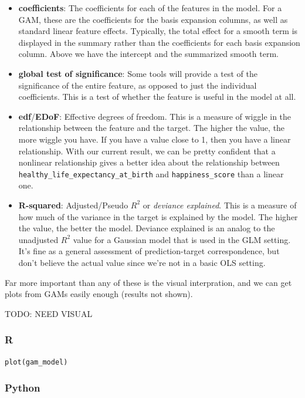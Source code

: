 \documentclass[
  letterpaper,
]{krantz}
\begin{document}
\begin{itemize}
\item
  \textbf{coefficients}: The coefficients for each of the features in
  the model. For a GAM, these are the coefficients for the basis
  expansion columns, as well as standard linear feature effects.
  Typically, the total effect for a smooth term is displayed in the
  summary rather than the coefficients for each basis expansion column.
  Above we have the intercept and the summarized smooth term.
\item
  \textbf{global test of significance}: Some tools will provide a test
  of the significance of the entire feature, as opposed to just the
  individual coefficients. This is a test of whether the feature is
  useful in the model at all.
\item
  \textbf{edf}/\textbf{EDoF}: Effective degrees of freedom. This is a
  measure of wiggle in the relationship between the feature and the
  target. The higher the value, the more wiggle you have. If you have a
  value close to 1, then you have a linear relationship. With our
  current result, we can be pretty confident that a nonlinear
  relationship gives a better idea about the relationship between
  \texttt{healthy\_life\_expectancy\_at\_birth} and
  \texttt{happiness\_score} than a linear one.
\item
  \textbf{R-squared}: Adjusted/Pseudo \(R^2\) or \emph{deviance
  explained}. This is a measure of how much of the variance in the
  target is explained by the model. The higher the value, the better the
  model. Deviance explained is an analog to the unadjusted \(R^2\) value
  for a Gaussian model that is used in the GLM setting. It's fine as a
  general assessment of prediction-target correspondence, but don't
  believe the actual value since we're not in a basic OLS setting.
\end{itemize}

Far more important than any of these is the visual interpration, and we
can get plots from GAMs easily enough (results not shown).

TODO: NEED VISUAL

\subsubsection{R}

\begin{verbatim}
plot(gam_model)
\end{verbatim}

\subsubsection{Python}
\end{document}
